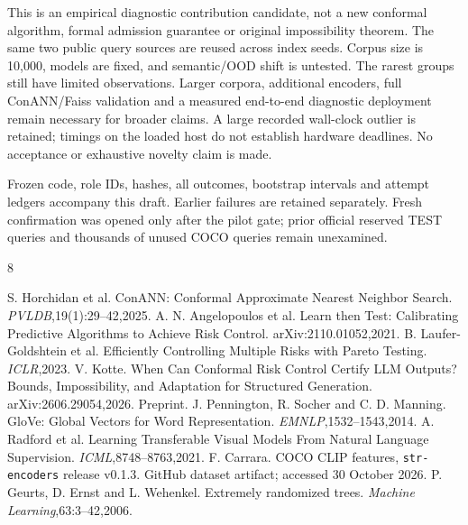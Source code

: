 \documentclass[a4paper,10pt]{esannV2}
\begin{document}
This is an empirical diagnostic contribution candidate, not a new conformal
algorithm, formal admission guarantee or original impossibility theorem. The
same two public query sources are reused across index seeds. Corpus size is
10,000, models are fixed, and semantic/OOD shift is untested. The rarest groups
still have limited observations. Larger corpora, additional encoders, full
ConANN/Faiss validation and a measured end-to-end diagnostic deployment remain
necessary for broader claims. A large recorded wall-clock outlier is retained;
timings on the loaded host do not establish hardware deadlines. No acceptance
or exhaustive novelty claim is made.

Frozen code, role IDs, hashes, all outcomes, bootstrap intervals and attempt
ledgers accompany this draft. Earlier failures are retained separately. Fresh
confirmation was opened only after the pilot gate; prior official reserved TEST
queries and thousands of unused COCO queries remain unexamined.

\begin{thebibliography}{8}
\raggedright
{} S. Horchidan et al. ConANN: Conformal Approximate Nearest
Neighbor Search. \emph{PVLDB},19(1):29--42,2025.
 A. N. Angelopoulos et al. Learn then Test: Calibrating Predictive
Algorithms to Achieve Risk Control. arXiv:2110.01052,2021.
 B. Laufer-Goldshtein et al. Efficiently Controlling Multiple
Risks with Pareto Testing. \emph{ICLR},2023.
 V. Kotte. When Can Conformal Risk Control Certify LLM
Outputs? Bounds, Impossibility, and Adaptation for Structured Generation.
arXiv:2606.29054,2026. Preprint.
 J. Pennington, R. Socher and C. D. Manning. GloVe: Global
Vectors for Word Representation. \emph{EMNLP},1532--1543,2014.
 A. Radford et al. Learning Transferable Visual Models From
Natural Language Supervision. \emph{ICML},8748--8763,2021.
 F. Carrara. COCO CLIP features, \texttt{str-encoders}
release v0.1.3. GitHub dataset artifact; accessed 30 October 2026.
 P. Geurts, D. Ernst and L. Wehenkel. Extremely randomized
trees. \emph{Machine Learning},63:3--42,2006.
\end{thebibliography}
\end{document}
